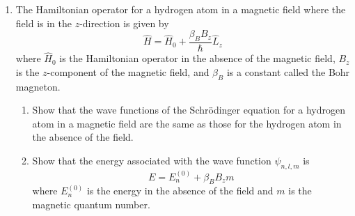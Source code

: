 \documentclass[../psets.tex]{subfiles}
\begin{document}
\begin{enumerate}
    \item The Hamiltonian operator for a hydrogen atom in a magnetic field where the field is in the $z$-direction is given by
    \begin{equation*}
        \hat{H} = \hat{H}_0+\frac{\beta_BB_z}{\hbar}\hat{L}_z
    \end{equation*}
    where $\hat{H}_0$ is the Hamiltonian operator in the absence of the magnetic field, $B_z$ is the $z$-component of the magnetic field, and $\beta_B$ is a constant called the Bohr magneton.
    \begin{enumerate}
        \item Show that the wave functions of the Schr\"{o}dinger equation for a hydrogen atom in a magnetic field are the same as those for the hydrogen atom in the absence of the field.
        \item Show that the energy associated with the wave function $\psi_{n,l,m}$ is
        \begin{equation*}
            E = E_n^{(0)}+\beta_BB_zm
        \end{equation*}
        where $E_n^{(0)}$ is the energy in the absence of the field and $m$ is the magnetic quantum number.
    \end{enumerate}
\end{enumerate}
\end{document}

